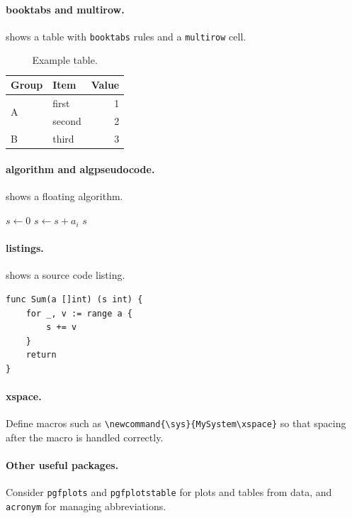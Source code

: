 \begin{instructions}
\paragraph{booktabs and multirow.}
 shows a table with \texttt{booktabs} rules and a \texttt{multirow} cell.
\begin{table}[t]
\centering
\caption{Example table.}
\label{tab:example}
\begin{tabular}{llr}
\toprule
Group & Item & Value \\
\midrule
\multirow{2}{*}{A} & first  & 1 \\
                   & second & 2 \\
B                  & third  & 3 \\
\bottomrule
\end{tabular}
\end{table}

\paragraph{algorithm and algpseudocode.}
 shows a floating algorithm.
\begin{algorithm}[t]
\caption{Sum of a list}
\label{alg:example}
\begin{algorithmic}[1]
  \State $s \gets 0$
    \State $s \gets s + a_i$
  \EndFor
  \State \Return $s$
\EndProcedure
\end{algorithmic}
\end{algorithm}

\paragraph{listings.}
 shows a source code listing.
\begin{lstlisting}[caption={Example listing.},label={lst:example},basicstyle=\ttfamily\small]
func Sum(a []int) (s int) {
	for _, v := range a {
		s += v
	}
	return
}
\end{lstlisting}

\paragraph{xspace.}
Define macros such as \verb|\newcommand{\sys}{MySystem\xspace}| so that spacing after the macro is handled correctly.

\paragraph{Other useful packages.}
Consider \texttt{pgfplots} and \texttt{pgfplotstable} for plots and tables from data, and \texttt{acronym} for managing abbreviations.
\end{instructions}
